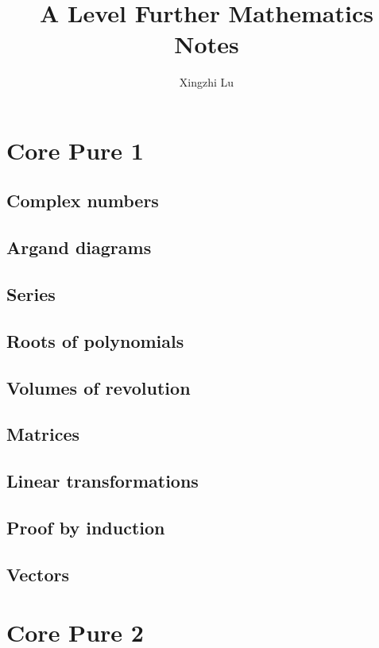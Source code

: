 \documentclass[oneside,fleqn,11pt]{book}
\title{A Level Further Mathematics Notes}
\author{Xingzhi Lu}
\date{}
\begin{document}
\everymath{\displaystyle}
\maketitle
\tableofcontents
\pagebreak
\part{Core Pure 1}
\chapter{Complex numbers}

\chapter{Argand diagrams}

\chapter{Series}

\chapter{Roots of polynomials}

\chapter{Volumes of revolution}

\chapter{Matrices}

\chapter{Linear transformations}

\chapter{Proof by induction}

\chapter{Vectors}


\setcounter{chapter}{0}

\part{Core Pure 2}
\end{document}

